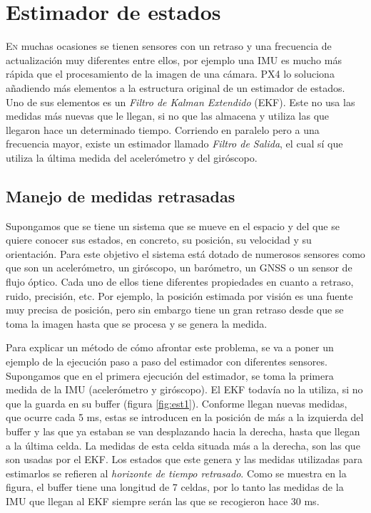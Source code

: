 \chapter{Estimador de estados}\label{chp-01}

\lettrine[lraise=-0.1, lines=2, loversize=0.2]{E}{n} muchas ocasiones se tienen sensores con un retraso y una frecuencia de actualización muy diferentes entre ellos, por ejemplo una IMU es mucho más rápida que el procesamiento de la imagen de una cámara. PX4 lo soluciona añadiendo más elementos a la estructura original de un estimador de estados. Uno de sus elementos es un \textit{Filtro de Kalman Extendido} (EKF). Este no usa las medidas más nuevas que le llegan, si no que las almacena y utiliza las que llegaron hace un determinado tiempo. Corriendo en paralelo pero a una frecuencia mayor, existe un estimador llamado \textit{Filtro de Salida}, el cual sí que utiliza la última medida del acelerómetro y del giróscopo. 

\section{Manejo de medidas retrasadas}
Supongamos que se tiene un sistema que se mueve en el espacio y del que se quiere conocer sus estados, en concreto, su posición, su velocidad y su orientación. Para este objetivo el sistema está dotado de numerosos sensores como que son un acelerómetro, un giróscopo, un barómetro, un GNSS o un sensor de flujo óptico. Cada uno de ellos tiene diferentes propiedades en cuanto a retraso, ruido, precisión, etc. Por ejemplo, la posición estimada por visión es una fuente muy precisa de posición, pero sin embargo tiene un gran retraso desde que se toma la imagen hasta que se procesa y se genera la medida. 

Para explicar un método de cómo afrontar  este problema, se va a poner un ejemplo de la ejecución paso a paso del estimador con diferentes sensores.
Supongamos que en el primera ejecución del estimador, se toma la primera medida de la IMU (acelerómetro y giróscopo). El EKF todavía no la utiliza, si no que la guarda en su buffer (figura \ref{fig:est1}). Conforme llegan nuevas medidas, que ocurre cada 5 ms, estas se introducen en la posición de más a la izquierda del buffer y las que ya estaban se van desplazando hacia la derecha, hasta que llegan a la última celda. La medidas de esta celda situada más a la derecha, son las que son usadas por el EKF. Los estados que este genera y las medidas utilizadas para estimarlos se refieren al \textit{horizonte de tiempo retrasado}. Como se muestra en la figura, el buffer tiene una longitud de 7 celdas, por lo tanto las medidas de la IMU que llegan al EKF siempre serán las que se recogieron hace 30 ms.  

